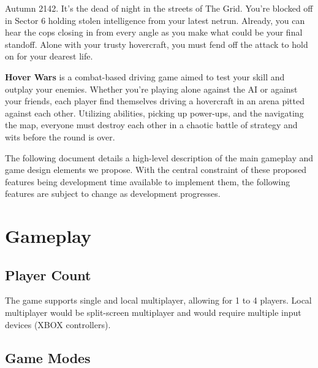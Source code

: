 \documentclass{article}
\newcommand{\namenobold}{Hover Wars}
\newcommand{\name}{\textbf{\namenobold}}
\theoremstyle{definition}
\begin{document}

Autumn 2142. It's the dead of night in the streets of The Grid. You're blocked
off in Sector 6 holding stolen intelligence from your latest netrun. Already,
you can hear the cops closing in from every angle as you make what could be
your final standoff. Alone with your trusty hovercraft, you must fend off the
attack to hold on for your dearest life.

\name{} is a combat-based driving game aimed to test your skill and outplay
your enemies. Whether you're playing alone against the AI or against your
friends, each player find themselves driving a hovercraft in an arena pitted
against each other. Utilizing abilities, picking up power-ups, and the
navigating the map, everyone must destroy each other in a chaotic battle of
strategy and wits before the round is over.

The following document details a high-level description of the main gameplay
and game design elements we propose. With the central constraint of these
proposed features being development time available to implement them, the
following features are subject to change as development progresses.

\section{Gameplay}

\subsection{Player Count}

The game supports single and local multiplayer, allowing for 1 to 4 players.
Local multiplayer would be split-screen multiplayer and would require multiple
input devices (XBOX controllers).

\subsection{Game Modes}
\end{document}
